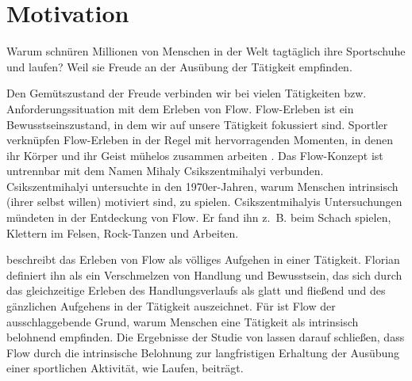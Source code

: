 

\section{Motivation} 

\label{sec:motivation}

Warum schnüren Millionen von Menschen in der Welt tagtäglich ihre Sportschuhe und laufen? Weil sie Freude an der Ausübung der Tätigkeit empfinden.

Den Gemütszustand der Freude verbinden wir bei vielen Tätigkeiten bzw. Anforderungssituation mit dem Erleben von Flow. Flow-Erleben ist ein Bewusstseinszustand, in dem wir auf unsere Tätigkeit fokussiert sind. Sportler verknüpfen Flow-Erleben in der Regel mit hervorragenden Momenten, in denen ihr Körper und ihr Geist mühelos zusammen arbeiten \citep[S.~5]{Jackson1999}. Das Flow-Konzept ist untrennbar mit dem Namen Mihaly Csikszentmihalyi verbunden. Csikszentmihalyi untersuchte in den 1970er-Jahren, warum Menschen intrinsisch (ihrer selbst willen) motiviert sind, zu spielen. Csikszentmihalyis Untersuchungen mündeten in der Entdeckung von Flow. Er fand ihn z.~B. beim Schach spielen, Klettern im Felsen, Rock-Tanzen und Arbeiten.

\citet[][S.~58f.]{Csikszentmihalyi2010} beschreibt das Erleben von Flow als völliges Aufgehen in einer Tätigkeit. Florian \citet[][S.~13]{Henk2014} definiert ihn als ein Verschmelzen von Handlung und Bewusstsein, das sich durch das gleichzeitige Erleben des Handlungsverlaufs als glatt und fließend und des gänzlichen Aufgehens in der Tätigkeit auszeichnet. Für \citet[][S.~602]{Csikszentmihalyi2005} ist Flow der ausschlaggebende Grund, warum Menschen eine Tätigkeit als intrinsisch belohnend empfinden. Die Ergebnisse der Studie von \citet[][S.~174]{Schuler2009} lassen darauf schließen, dass Flow durch die intrinsische Belohnung zur langfristigen Erhaltung der Ausübung einer sportlichen Aktivität, wie Laufen, beiträgt.

